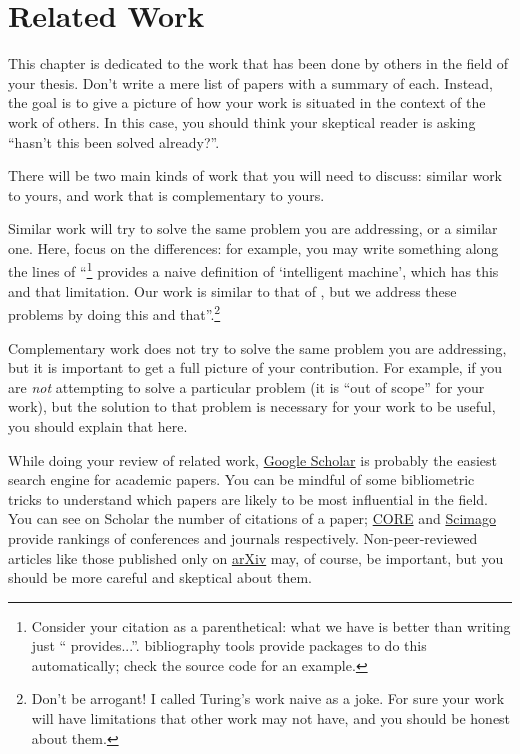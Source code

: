 \chapter{Related Work}
\label{sec:related}

This chapter is dedicated to the work that has been done by others in the field of your thesis.
Don't write a mere list of papers with a summary of each. Instead, the goal is to give a picture
of how your work is situated in the context of the work of others. In this case, you should
think your skeptical reader is asking ``hasn't this been solved already?''.

There will be two main kinds of work that you will need to discuss: similar work
to yours, and work that is complementary to yours.

Similar work will try to solve the same problem you are addressing, or a similar one.
Here, focus on the differences: for example, you may write something along the
lines of ``\textcite{DBLP:journals/x/Turing50}\footnote{Consider your citation as a parenthetical: what we have is better than writing just ``\cite{DBLP:journals/x/Turing50} provides...''. \latex bibliography tools provide packages to do this automatically; check the source code for an example.}
provides a naive definition of
`intelligent machine', which has this and that limitation. Our work is similar to that of
\citeauthor{DBLP:journals/x/Turing50}, but we address these problems by doing this and
that''.\footnote{Don't be arrogant! I called Turing's work naive as a joke.
For sure your work will have limitations that other work
may not have, and you should be honest about them.}

Complementary work does not try to solve the same problem you are addressing, but it is
important to get a full picture of your contribution. For example, if you are
\emph{not} attempting to solve a particular problem (it is ``out of scope'' for your work),
but the solution to that problem is necessary for your work to be useful, you should explain
that here.

While doing your review of related work, \href{https://scholar.google.com}{Google Scholar}
is probably the easiest search engine for academic papers. You can be mindful of some
bibliometric tricks to understand which papers are likely to be most influential in the field.
You can see on Scholar the number of citations of a paper;
\href{https://portal.core.edu.au/conf-ranks/}{CORE} and
\href{https://www.scimagojr.com}{Scimago} provide rankings of conferences and journals
respectively. Non-peer-reviewed articles like those published only on
\href{https://arxiv.org}{arXiv} may, of course, be important, but you should be more careful
and skeptical about them.

